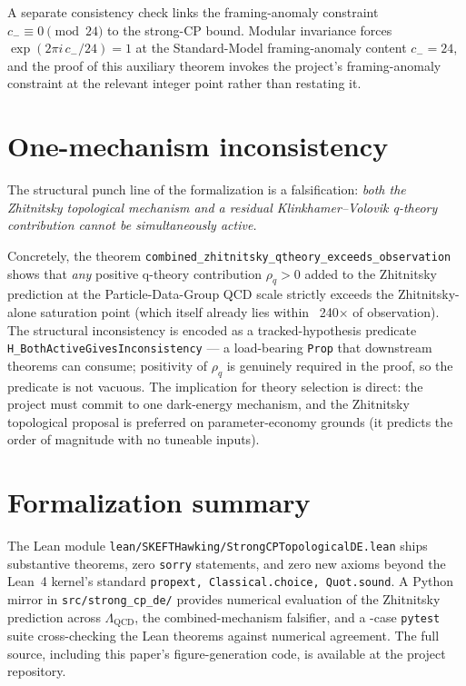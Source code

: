 \documentclass[twocolumn]{revtex4-2}
\newcommand{\Lqcd}{\Lambda_{\mathrm{QCD}}}
\begin{document}
A separate consistency check links the framing-anomaly constraint
$c_- \equiv 0 \pmod{24}$ to the strong-CP bound. Modular invariance
forces $\exp(2\pi i\,c_-/24) = 1$ at the Standard-Model framing-anomaly
content $c_- = 24$, and the proof of this auxiliary theorem invokes the
project's framing-anomaly constraint at the relevant integer point
rather than restating it.

\section{One-mechanism inconsistency}
\label{sec:correctness_push}

The structural punch line of the formalization is a falsification:
\emph{both the Zhitnitsky topological mechanism and a residual
Klinkhamer--Volovik q-theory contribution cannot be simultaneously
active.}

Concretely, the theorem
\verb|combined_zhitnitsky_qtheory_exceeds_observation| shows that
\emph{any} positive q-theory contribution $\rho_{q} > 0$ added to the
Zhitnitsky prediction at the Particle-Data-Group QCD scale strictly
exceeds the Zhitnitsky-alone saturation point (which itself
already lies within ~240$\times$ of observation). The structural
inconsistency is encoded as a tracked-hypothesis predicate
\verb|H_BothActiveGivesInconsistency| --- a load-bearing
\texttt{Prop} that downstream theorems can consume; positivity of
$\rho_{q}$ is genuinely required in the proof, so the predicate is
not vacuous. The
implication for theory selection is direct: the project must commit to
one dark-energy mechanism, and the Zhitnitsky topological proposal is
preferred on parameter-economy grounds (it predicts the order of
magnitude with no tuneable inputs).

\section{Formalization summary}
\label{sec:formalization}

The Lean module
\texttt{lean/SKEFTHawking/StrongCPTopologicalDE.lean} ships \strongCpDeThms{}
substantive theorems, zero \texttt{sorry} statements, and zero new
axioms beyond the Lean~4 kernel's standard
\texttt{propext, Classical.choice, Quot.sound}. A Python mirror in
\texttt{src/strong\_cp\_de/} provides numerical evaluation of the
Zhitnitsky prediction across $\Lqcd$, the combined-mechanism
falsifier, and a \strongCpDeTests{}-case \texttt{pytest} suite cross-checking the
Lean theorems against numerical agreement. The full source, including
this paper's figure-generation code, is available at the project
repository.
\end{document}
